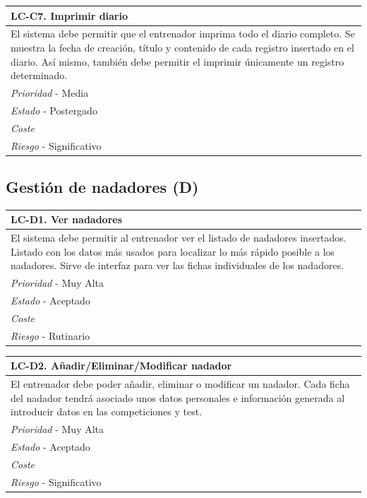 	\begin{center}
		\begin{tabularx}{15cm}{|X|}
			\hline 
				\bf{LC-C7. Imprimir diario}\\
			\hline
				El sistema debe permitir que el entrenador imprima todo el diario completo. Se muestra la fecha de creación, título y contenido de cada registro insertado en el diario. Así mismo, también debe permitir el imprimir únicamente un registro determinado.\\
			\hline
				{\it Prioridad} - Media\\
			\hline
				{\it Estado} - Postergado\\
			\hline
				{\it Coste}\\
			\hline
				{\it Riesgo} - Significativo\\
			\hline
		\end{tabularx}
	\end{center}


% 
%
\subsection{Gestión de nadadores (D)} %
	\label{sub:gestion_de_nadadores}
	
	\begin{center}
		\begin{tabularx}{15cm}{|X|}
			\hline 
				\bf{LC-D1. Ver nadadores}\\
			\hline
				El sistema debe permitir al entrenador ver el listado de nadadores insertados. Listado con los datos más usados para localizar lo más rápido posible a los nadadores. Sirve de interfaz para ver las fichas individuales de los nadadores.\\
			\hline
				{\it Prioridad} - Muy Alta\\
			\hline
				{\it Estado} - Aceptado\\
			\hline
				{\it Coste}\\
			\hline
				{\it Riesgo} - Rutinario\\
			\hline
		\end{tabularx}
	\end{center}
	
	\begin{center}
		\begin{tabularx}{15cm}{|X|}
			\hline 
				\bf{LC-D2. Añadir/Eliminar/Modificar nadador}\\
			\hline
				El entrenador debe poder añadir, eliminar o modificar un nadador. Cada ficha del nadador tendrá asociado unos datos personales e información generada al introducir datos en las competiciones y test.\\
			\hline
				{\it Prioridad} - Muy Alta\\
			\hline
				{\it Estado} - Aceptado\\
			\hline
				{\it Coste}\\
			\hline
				{\it Riesgo} - Significativo\\
			\hline
		\end{tabularx}
	\end{center}
	

